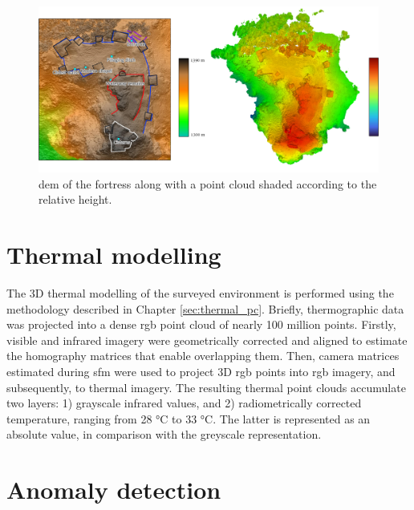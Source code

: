 \begin{figure}[htbp]
    \centering
    \includegraphics[width=\linewidth]{figs/castle_puerta_arenas/fortress_height.png}
    \caption{\acrshort{dem} of the fortress along with a point cloud shaded according to the relative height. }
    \label{fig:thermal_castle_dem}
\end{figure}

\section{Thermal modelling}

The 3D thermal modelling of the surveyed environment is performed using the methodology described in Chapter \ref{sec:thermal_pc}. Briefly, thermographic data was projected into a dense \acrshort{rgb} point cloud of nearly 100 million points. Firstly, visible and infrared imagery were geometrically corrected and aligned to estimate the homography matrices that enable overlapping them. Then, camera matrices estimated during \acrshort{sfm} were used to project 3D \acrshort{rgb} points into \acrshort{rgb} imagery, and subsequently, to thermal imagery. The resulting thermal point clouds accumulate two layers: 1) grayscale infrared values, and 2) radiometrically corrected temperature, ranging from 28 \si{\celsius} to 33 \si{\celsius}. The latter is represented as an absolute value, in comparison with the greyscale representation.

\section{Anomaly detection}

